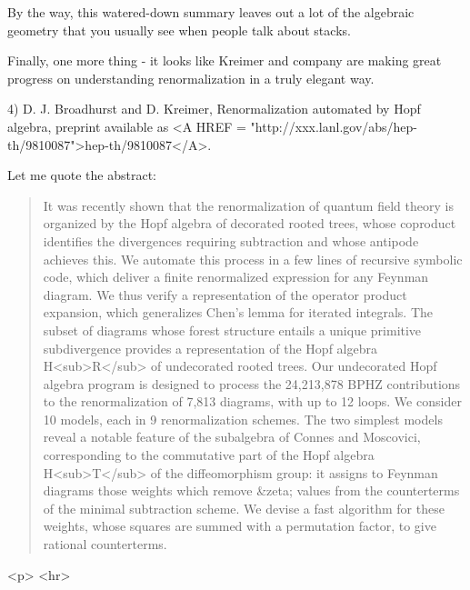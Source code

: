 By the way, this watered-down summary leaves out a lot of the
algebraic geometry that you usually see when people talk about stacks.

Finally, one more thing - it looks like Kreimer and company are making
great progress on understanding renormalization in a truly elegant way. 

4) D. J. Broadhurst and D. Kreimer, Renormalization automated by Hopf algebra,
preprint available as 
<A HREF = "http://xxx.lanl.gov/abs/hep-th/9810087">hep-th/9810087</A>.  


Let me quote the abstract:

\begin{quote}
It was recently shown that the renormalization of quantum field theory
is organized by the Hopf algebra of decorated rooted trees, whose
coproduct identifies the divergences requiring subtraction and whose
antipode achieves this. We automate this process in a few lines of
recursive symbolic code, which deliver a finite renormalized expression
for any Feynman diagram. We thus verify a representation of the operator
product expansion, which generalizes Chen's lemma for iterated
integrals. The subset of diagrams whose forest structure entails a
unique primitive subdivergence provides a representation of the Hopf
algebra H<sub>R</sub> of undecorated rooted trees. Our undecorated Hopf algebra
program is designed to process the 24,213,878 BPHZ contributions to the
renormalization of 7,813 diagrams, with up to 12 loops. We consider 10
models, each in 9 renormalization schemes. The two simplest models
reveal a notable feature of the subalgebra of Connes and Moscovici,
corresponding to the commutative part of the Hopf algebra H<sub>T</sub> of the
diffeomorphism group: it assigns to Feynman diagrams those weights which
remove &zeta; values from the counterterms of the minimal subtraction
scheme. We devise a fast algorithm for these weights, whose squares are
summed with a permutation factor, to give rational counterterms.
\end{quote}
    


<p> <hr>



